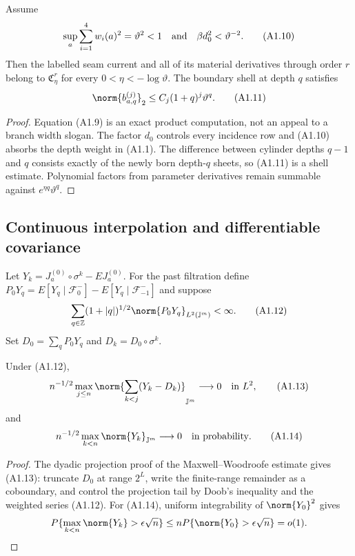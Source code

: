 \begin{proposition}
\label{prop:r29-a1-geometric}
Assume
\[
 \sup_a\sum_{i=1}^{4}w_i(a)^2=\vartheta^2<1
 \quad\hbox{and}\quad \beta d_0^2<\vartheta^{-2}.         \tag{A1.10}
\]
Then the labelled seam current and all of its material derivatives through
order $r$ belong to $\mathfrak C^r_\eta$ for every
$0<\eta<-\log\vartheta$.  The boundary shell at depth $q$ satisfies
\[
 \norm{b^{(j)}_{a,q}}_2\le C_j(1+q)^j\vartheta^q.          \tag{A1.11}
\]
\end{proposition}

\begin{proof}
Equation (A1.9) is an exact product computation, not an appeal to a branch
width slogan.  The factor $d_0$ controls every incidence row and (A1.10)
absorbs the depth weight in (A1.1).  The difference between cylinder depths
$q-1$ and $q$ consists exactly of the newly born depth-$q$ sheets, so (A1.11)
is a shell estimate.  Polynomial factors from parameter derivatives remain
summable against $e^{\eta q}\vartheta^q$.
\end{proof}

\subsection{Continuous interpolation and differentiable covariance}

Let
$Y_k=J^{(0)}_a\circ\sigma^k-EJ^{(0)}_a$.  For the past filtration define
$P_0Y_q=E[Y_q\mid\mathcal F_0^-]-E[Y_q\mid\mathcal F_{-1}^-]$ and suppose
\[
 \sum_{q\in\mathbb Z}(1+|q|)^{1/2}
\norm{P_0Y_q}_{L^2(\mathbb J^m)}<\infty.
                                                                    \tag{A1.12}
\]
Set $D_0=\sum_qP_0Y_q$ and $D_k=D_0\circ\sigma^k$.

\begin{lemma}
\label{lem:r29-a1-maximal}
Under (A1.12),
\[
 n^{-1/2}\max_{j\le n}
 \norm{\sum_{k<j}(Y_k-D_k)}_{\mathbb J^m}\longrightarrow0
 \quad\hbox{in }L^2,                                      \tag{A1.13}
\]
and
\[
 n^{-1/2}\max_{k<n}\norm{Y_k}_{\mathbb J^m}
 \longrightarrow0\quad\hbox{in probability}.             \tag{A1.14}
\]
\end{lemma}

\begin{proof}
The dyadic projection proof of the Maxwell--Woodroofe estimate gives (A1.13):
truncate $D_0$ at range $2^L$, write the finite-range remainder as a
coboundary, and control the projection tail by Doob's inequality and the
weighted series (A1.12).  For (A1.14), uniform integrability of
$\norm{Y_0}^2$ gives
\[
 P\{\max_{k<n}\norm{Y_k}>\epsilon\sqrt n\}
 \le nP\{\norm{Y_0}>\epsilon\sqrt n\}=o(1).
\]
\end{proof}

